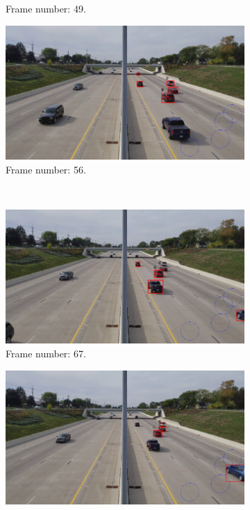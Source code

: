 \begin{figure}[H]
\begin{subfigure}{0.48\textwidth}
        \caption{Frame number: 49.}
        \label{fig:E1-V1-S0:03}
    \end{subfigure}
    \begin{subfigure}{0.48\textwidth}
        \centering
        \includegraphics[width=\linewidth]{../../../experiments/E1/V1/noPd/56}
        \caption{Frame number: 56.}
        \label{fig:E1-V1-S0:04}
    \end{subfigure}
    \\
    \begin{subfigure}{0.48\textwidth}
        \centering
        \includegraphics[width=\linewidth]{../../../experiments/E1/V1/noPd/67}
        \caption{Frame number: 67.}
        \label{fig:E1-V1-S0:05}
    \end{subfigure}
    \begin{subfigure}{0.48\textwidth}
        \centering
        \includegraphics[width=\linewidth]{../../../experiments/E1/V1/noPd/69}

\end{subfigure}
\end{figure}
